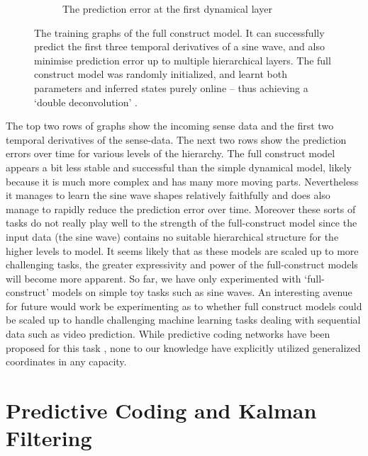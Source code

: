 \begin{figure}[H]
\begin{subfigure}{.3\linewidth}
 \caption{The prediction error at the first dynamical layer}%
\end{subfigure}
 \hfill
\caption{The training graphs of the full construct model. It can successfully predict the first three temporal derivatives of a sine wave, and also minimise prediction error up to multiple hierarchical layers. The full construct model was randomly initialized, and learnt both parameters and inferred states purely online -- thus achieving a `double deconvolution' \citep{friston2008DEM}.}
\end{figure}

The top two rows of graphs show the incoming sense data and the first two temporal derivatives of the sense-data. The next two rows show the prediction errors over time for various levels of the hierarchy. The full construct model appears a bit less stable and successful than the simple dynamical model, likely because it is much more complex and has many more moving parts. Nevertheless it manages to learn the sine wave shapes relatively faithfully and does also manage to rapidly reduce the prediction error over time. Moreover these sorts of tasks do not really play well to the strength of the full-construct model since the input data (the sine wave) contains no suitable hierarchical structure for the higher levels to model. It seems likely that as these models are scaled up to more challenging tasks, the greater expressivity and power of the full-construct models will become more apparent. So far, we have only experimented with `full-construct' models on simple toy tasks such as sine waves. An interesting avenue for future would work be experimenting as to whether full construct models could be scaled up to handle challenging machine learning tasks dealing with sequential data such as video prediction. While predictive coding networks have been proposed for this task \citep{lotter2016deep}, none to our knowledge have explicitly utilized generalized coordinates in any capacity.

\section{Predictive Coding and Kalman Filtering}

